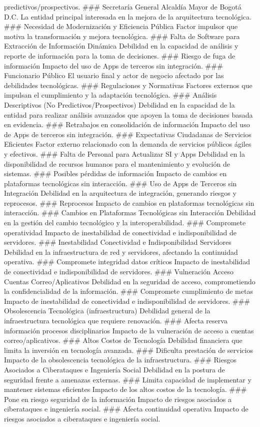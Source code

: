 \documentclass[
	a4paper, %
	12pt, %
]{include/CSSullivanBusinessReport}
\begin{document}
predictivos/prospectivos. \#\#\# Secretaría General Alcaldía Mayor de
Bogotá D.C. La entidad principal interesada en la mejora de la
arquitectura tecnológica. \#\#\# Necesidad de Modernización y Eficiencia
Pública Factor impulsor que motiva la transformación y mejora
tecnológica. \#\#\# Falta de Software para Extracción de Información
Dinámica Debilidad en la capacidad de análisis y reporte de información
para la toma de decisiones. \#\#\# Riesgo de fuga de información Impacto
del uso de Apps de terceros sin integración. \#\#\# Funcionario Público
El usuario final y actor de negocio afectado por las debilidades
tecnológicas. \#\#\# Regulaciones y Normativas Factores externos que
impulsan el cumplimiento y la adaptación tecnológica. \#\#\# Análisis
Descriptivos (No Predictivos/Prospectivos) Debilidad en la capacidad de
la entidad para realizar análisis avanzados que apoyen la toma de
decisiones basada en evidencia. \#\#\# Retrabajos en consolidación de
información Impacto del uso de Apps de terceros sin integración. \#\#\#
Expectativas Ciudadanas de Servicios Eficientes Factor externo
relacionado con la demanda de servicios públicos ágiles y efectivos.
\#\#\# Falta de Personal para Actualizar SI y Apps Debilidad en la
disponibilidad de recursos humanos para el mantenimiento y evolución de
sistemas. \#\#\# Posibles pérdidas de información Impacto de cambios en
plataformas tecnológicas sin interacción. \#\#\# Uso de Apps de Terceros
sin Integración Debilidad en la arquitectura de integración, generando
riesgos y reprocesos. \#\#\# Reprocesos Impacto de cambios en
plataformas tecnológicas sin interacción. \#\#\# Cambios en Plataformas
Tecnológicas sin Interacción Debilidad en la gestión del cambio
tecnológico y la interoperabilidad. \#\#\# Compromete operatividad
Impacto de inestabilidad de conectividad e indisponibilidad de
servidores. \#\#\# Inestabilidad Conectividad e Indisponibilidad
Servidores Debilidad en la infraestructura de red y servidores,
afectando la continuidad operativa. \#\#\# Compromete integridad datos
críticos Impacto de inestabilidad de conectividad e indisponibilidad de
servidores. \#\#\# Vulneración Acceso Cuentas Correo/Aplicativos
Debilidad en la seguridad de acceso, comprometiendo la confidencialidad
de la información. \#\#\# Compromete cumplimiento de metas Impacto de
inestabilidad de conectividad e indisponibilidad de servidores. \#\#\#
Obsolescencia Tecnológica (infraestructura) Debilidad general de la
infraestructura tecnológica que requiere renovación. \#\#\# Afecta
reserva información procesos disciplinarios Impacto de la vulneración de
acceso a cuentas correo/aplicativos. \#\#\# Altos Costos de Tecnología
Debilidad financiera que limita la inversión en tecnología avanzada.
\#\#\# Dificulta prestación de servicios Impacto de la obsolescencia
tecnológica de la infraestructura. \#\#\# Riesgos Asociados a
Ciberataques e Ingeniería Social Debilidad en la postura de seguridad
frente a amenazas externas. \#\#\# Limita capacidad de implementar y
mantener sistemas eficientes Impacto de los altos costos de la
tecnología. \#\#\# Pone en riesgo seguridad de la información Impacto de
riesgos asociados a ciberataques e ingeniería social. \#\#\# Afecta
continuidad operativa Impacto de riesgos asociados a ciberataques e
ingeniería social.
\end{document}
